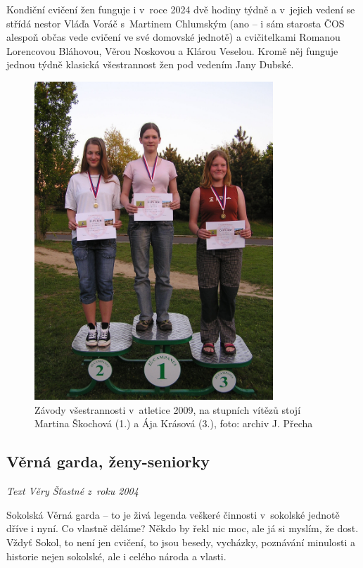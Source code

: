 \documentclass[a5paper, 11pt, twoside]{article}
\begin{document}
Kondiční cvičení žen funguje i v~roce 2024 dvě hodiny týdně a v~jejich
vedení se střídá nestor Vláďa Voráč s~Martinem Chlumským (ano -- i sám
starosta ČOS alespoň občas vede cvičení ve své domovské jednotě) a
cvičitelkami Romanou Lorencovou Bláhovou, Věrou Noskovou a Klárou
Veselou. Kromě něj funguje jednou týdně klasická všestrannost žen pod
vedením Jany Dubské.

\begin{figure}[h!]
  \centering 
  \includegraphics[width=0.8\textwidth]{img/74_zavody_atletika.JPG}
  \caption*{Závody všestrannosti v~atletice 2009, na stupních vítězů stojí
  Martina Škochová (1.) a Ája Krásová (3.), foto: archiv J. Přecha}
\end{figure}

\subsection{Věrná garda, ženy-seniorky}

\begin{center}
  \textit{Text Věry Šťastné z~roku 2004}
\end{center}

Sokolská Věrná garda -- to je živá legenda veškeré činnosti v~sokolské
jednotě dříve i nyní. Co vlastně děláme? Někdo by řekl nic moc, ale já
si myslím, že dost. Vždyť Sokol, to není jen cvičení, to jsou besedy,
vycházky, poznávání minulosti a historie nejen sokolské, ale i celého
národa a vlasti.
\end{document}

